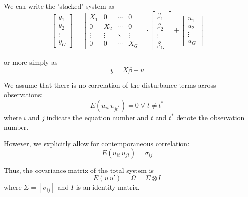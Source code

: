 \documentclass[article]{jss}
\begin{document}
We can write the 'stacked' system as
\begin{equation}
   \left[ \begin{array}{c}
      y_1 \\ y_2\\ \vdots\\ y_G
   \end{array} \right] = 
   \left[ \begin{array}{cccc}
      X_1 & 0 & \cdots & 0\\
      0 & X_2 & \cdots & 0\\
      \vdots & \vdots & \ddots & \vdots\\
      0 & 0 & \cdots & X_G
   \end{array}\right] \cdot 
   \left[ \begin{array}{c}
      \beta_1 \\ \beta_2 \\ \vdots\\ \beta_G
   \end{array} \right] +
   \left[ \begin{array}{c}
      u_1 \\ u_2 \\ \vdots\\ u_G
   \end{array} \right]
\end{equation}

or more simply as
\begin{equation}
   y = X \beta + u 
\end{equation}   

We assume that there is no correlation of the disturbance terms 
across observations:
\begin{equation}
   E \left( u_{it} \, u_{jt^*} \right) = 0 
   \; \forall \; t \neq t^*
\end{equation}
where $i$ and $j$ indicate the equation number 
and $t$ and $t^*$ denote the observation number.

However, we explicitly allow for contemporaneous correlation:
\begin{equation}
   E \left( u_{it} \, u_{jt} \right) = \sigma_{ij}
\end{equation}

Thus, the covariance matrix of the total system is
\begin{equation}
   E \left( u \, u' \right) = \Omega = \Sigma \otimes I
\end{equation}
where $\Sigma = \left[ \sigma_{ij} \right]$ and $I$ is an
identity matrix.
\end{document}
